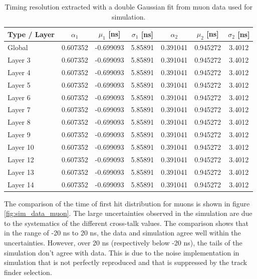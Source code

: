 \begin{table}[htb!]
	\centering
	\caption{Timing resolution extracted with a double Gaussian fit from muon data used for simulation.}
	\label{table:time_res_sim}
	\begin{tabular}{@{} lcccccc @{}}
		\toprule
		Type / Layer & $\alpha_{1}$ & $\mu_{1}$ [ns] & $\sigma_{1}$ [ns] & $\alpha_{2}$ & $\mu_{2}$ [ns] & $\sigma_{2}$ [ns] \\
		\midrule
		Global & 0.607352 & -0.699093 & 5.85891 & 0.391041 & 0.945272 & 3.4012 \\
		\midrule
		Layer 3 & 0.607352 & -0.699093 & 5.85891 & 0.391041 & 0.945272 & 3.4012 \\
		Layer 4 & 0.607352 & -0.699093 & 5.85891 & 0.391041 & 0.945272 & 3.4012 \\
		Layer 5 & 0.607352 & -0.699093 & 5.85891 & 0.391041 & 0.945272 & 3.4012 \\
		Layer 6 & 0.607352 & -0.699093 & 5.85891 & 0.391041 & 0.945272 & 3.4012 \\
		Layer 7 & 0.607352 & -0.699093 & 5.85891 & 0.391041 & 0.945272 & 3.4012 \\
		Layer 8 & 0.607352 & -0.699093 & 5.85891 & 0.391041 & 0.945272 & 3.4012 \\
		Layer 9 & 0.607352 & -0.699093 & 5.85891 & 0.391041 & 0.945272 & 3.4012 \\
		Layer 10 & 0.607352 & -0.699093 & 5.85891 & 0.391041 & 0.945272 & 3.4012 \\
		Layer 12 & 0.607352 & -0.699093 & 5.85891 & 0.391041 & 0.945272 & 3.4012 \\
		Layer 13 & 0.607352 & -0.699093 & 5.85891 & 0.391041 & 0.945272 & 3.4012 \\
		Layer 14 & 0.607352 & -0.699093 & 5.85891 & 0.391041 & 0.945272 & 3.4012 \\
		\bottomrule
	\end{tabular}
\end{table}

The comparison of the time of first hit distribution for muons is shown in figure \ref{fig:sim_data_muon}. The large uncertainties observed in the simulation are due to the systematics of the different cross-talk values. The comparison shows that in the range of -20 ns to 20 ns, the data and simulation agree well within the uncertainties. However, over 20 ns (respectively below -20 ns), the tails of the simulation don't agree with data. This is due to the noise implementation in simulation that is not perfectly reproduced and that is suppressed by the track finder selection.

